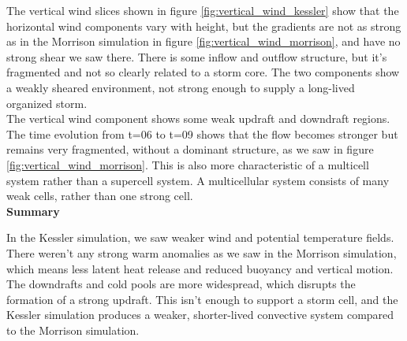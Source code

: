 \documentclass{article}
\begin{document}
The vertical wind slices shown in figure \ref{fig:vertical_wind_kessler} show that the horizontal wind components vary with height, but the gradients are not as strong as in the Morrison simulation in figure \ref{fig:vertical_wind_morrison}, and have no strong shear we saw there. There is some inflow and outflow structure, but it's fragmented and not so clearly related to a storm core. The two components show a weakly sheared environment, not strong enough to supply a long-lived organized storm. \\

The vertical wind component shows some weak updraft and downdraft regions. The time evolution from t=06 to t=09 shows that the flow becomes stronger but remains very fragmented, without a dominant structure, as we saw in figure \ref{fig:vertical_wind_morrison}. This is also more characteristic of a multicell system rather than a supercell system. A multicellular system consists of many weak cells, rather than one strong cell. \\

\textbf{Summary}

In the Kessler simulation, we saw weaker wind and potential temperature fields. There weren't any strong warm anomalies as we saw in the Morrison simulation, which means less latent heat release and reduced buoyancy and vertical motion. The downdrafts and cold pools are more widespread, which disrupts the formation of a strong updraft. This isn't enough to support a storm cell, and the Kessler simulation produces a weaker, shorter-lived convective system compared to the Morrison simulation. 
\end{document}
